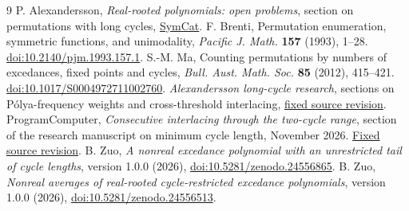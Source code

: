 \documentclass[10pt,a4paper]{article}
\begin{document}
\begin{thebibliography}{9}
 P. Alexandersson, \emph{Real-rooted polynomials: open problems}, section on permutations with long cycles, \href{https://www.symmetricfunctions.com/realRootedOpenProblems.htm\#permutations-with-long-cycles}{SymCat}.
 F. Brenti, Permutation enumeration, symmetric functions, and unimodality, \emph{Pacific J. Math.} \textbf{157} (1993), 1--28. \href{https://doi.org/10.2140/pjm.1993.157.1}{doi:10.2140/pjm.1993.157.1}.
 S.-M. Ma, Counting permutations by numbers of excedances, fixed points and cycles, \emph{Bull. Aust. Math. Soc.} \textbf{85} (2012), 415--421. \href{https://doi.org/10.1017/S0004972711002760}{doi:10.1017/S0004972711002760}.
 \emph{Alexandersson long-cycle research}, sections on P\'olya-frequency weights and cross-threshold interlacing, \href{https://github.com/1337isnot1337/solved-conjectures/blob/0c07434ef991b853528ca55926b3b83820b7f58d/docs/alexandersson-long-cycle-research.md}{fixed source revision}.
 ProgramComputer, \emph{Consecutive interlacing through the two-cycle range}, section of the research manuscript on minimum cycle length, November 2026. \href{https://github.com/ProgramComputer/open-math-research/blob/4da48b72ed8f92f96c2faf60e2d63d253b3b507a/topics/long-cycle-excedances/two-cycle-insertion.tex}{Fixed source revision}.
 B. Zuo, \emph{A nonreal excedance polynomial with an unrestricted tail of cycle lengths}, version 1.0.0 (2026), \href{https://doi.org/10.5281/zenodo.24556865}{doi:10.5281/zenodo.24556865}.
 B. Zuo, \emph{Nonreal averages of real-rooted cycle-restricted excedance polynomials}, version 1.0.0 (2026), \href{https://doi.org/10.5281/zenodo.24556513}{doi:10.5281/zenodo.24556513}.
\end{thebibliography}
\end{document}
